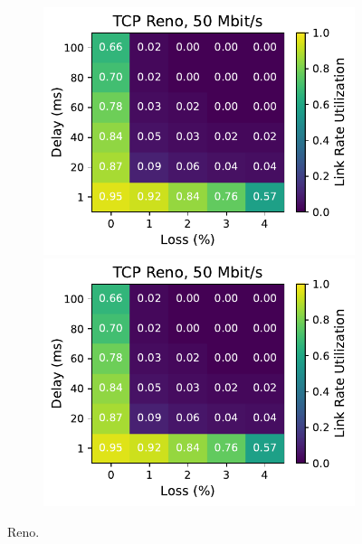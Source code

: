 \begin{figure}[ht]
\begin{subfigure}[b]{0.89cm}
        \includegraphics[width=\linewidth,trim={8cm 0 0 0},clip]{splitting-paper/figures/heatmaps/heatmap_tcp_reno_50mbps.pdf}
        \includegraphics[width=\linewidth,trim={8cm 0 0 0},clip]{splitting-paper/figures/heatmaps/heatmap_tcp_reno_50mbps.pdf}
        \vspace*{0.2cm}
    \end{subfigure}
    \caption{Reno.}
\end{figure}
